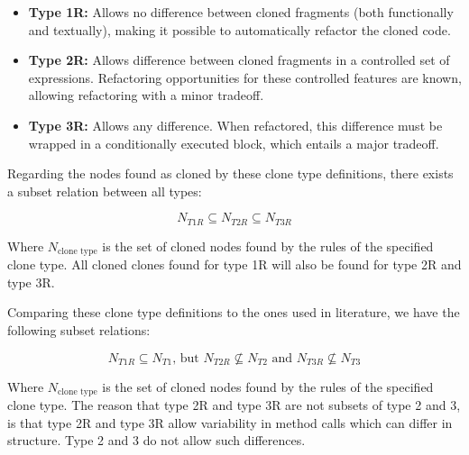 \begin{itemize}
\item \textbf{Type 1R:} Allows no difference between cloned fragments (both functionally and textually), making it possible to automatically refactor the cloned code. \\
\item \textbf{Type 2R:} Allows difference between cloned fragments in a controlled set of expressions. Refactoring opportunities for these controlled features are known, allowing refactoring with a minor tradeoff. \\
\item \textbf{Type 3R:} Allows any difference. When refactored, this difference must be wrapped in a conditionally executed block, which entails a major tradeoff.
\end{itemize}

Regarding the nodes found as cloned by these clone type definitions, there exists a subset relation between all types:

\begin{equation}\label{eq:typerelation}
N_{T1R} \subseteq N_{T2R} \subseteq N_{T3R}
\end{equation}

Where $N_{\text{clone type}}$ is the set of cloned nodes found by the rules of the specified clone type. All cloned clones found for type 1R will also be found for type 2R and type 3R.

Comparing these clone type definitions to the ones used in literature, we have the following subset relations:

\begin{equation}\label{eq:typerelation2}
N_{T1R} \subseteq N_{T1} \text{, but } N_{T2R} \nsubseteq N_{T2} \text{ and } N_{T3R} \nsubseteq N_{T3}
\end{equation}

Where $N_{\text{clone type}}$ is the set of cloned nodes found by the rules of the specified clone type. The reason that type 2R and type 3R are not subsets of type 2 and 3, is that type 2R and type 3R allow variability in method calls which can differ in structure. Type 2 and 3 do not allow such differences.

